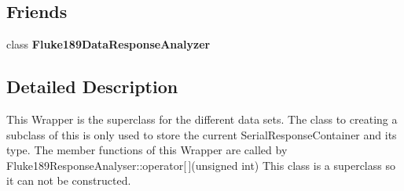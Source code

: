 \subsection*{Friends}
\begin{DoxyCompactItemize}
\item 
\hypertarget{classFluke_1_1Fluke189DataResponseAnalyzerWrapper_a268eb1bf9fac46f61af93c2c1e309713}{
class {\bfseries Fluke189DataResponseAnalyzer}}
\label{classFluke_1_1Fluke189DataResponseAnalyzerWrapper_a268eb1bf9fac46f61af93c2c1e309713}

\end{DoxyCompactItemize}


\subsection{Detailed Description}
This Wrapper is the superclass for the different data sets. The class to creating a subclass of this is only used to store the current SerialResponseContainer and its type. The member functions of this Wrapper are called by Fluke189ResponseAnalyser::operator\mbox{[}$\,$\mbox{]}(unsigned int) This class is a superclass so it can not be constructed. 

